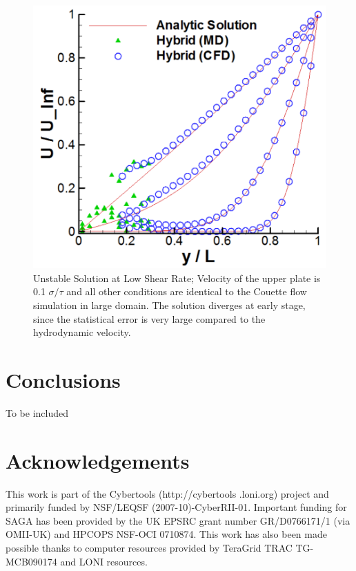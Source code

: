 \documentclass[preprint,12pt]{elsarticle}
\begin{document}
\begin{figure}
\centering
\includegraphics[width=0.6\linewidth]{Couette_Noisy.pdf}
\vskip-0.2cm
\caption{\small Unstable Solution at Low Shear Rate; Velocity of the upper plate is 0.1 $\sigma / \tau$ and all other conditions are identical to the Couette flow simulation in large domain. The solution diverges at early stage, since the statistical error is very large compared to the hydrodynamic velocity.}
\label{Stokes_Sol}
\end{figure}



\section{Conclusions}
To be included

\section*{Acknowledgements}
This work is part of the Cybertools (http://cybertools .loni.org)
project and primarily funded by NSF/LEQSF (2007-10)-CyberRII-01.
Important funding for SAGA has been provided by the UK EPSRC grant
number GR/D0766171/1 (via OMII-UK) and HPCOPS NSF-OCI 0710874. This
work has also been made possible thanks to computer resources provided
by TeraGrid TRAC TG-MCB090174 and LONI resources.


\end{document}
